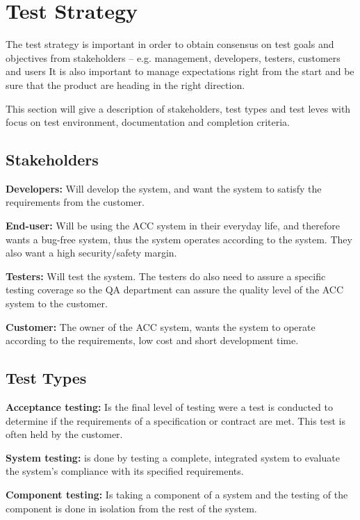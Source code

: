 \chapter{Test Strategy}
	
	The test strategy is important in order to obtain consensus on test goals and objectives 
	from stakeholders – e.g. management, developers, testers, customers and users
	It is also important to manage expectations right from the start and be sure that the product
	are heading in the right direction.

	This section will give a description of stakeholders, test types and test leves with focus on
	test environment, documentation and completion criteria. 
	


\clearpage
	\section{Stakeholders}

		{\bf Developers:} Will develop the system, and want the system to satisfy 
		the requirements from the customer. 

		{\bf End-user:} Will be using the ACC system in their everyday life, and therefore 
		wants a bug-free system, thus the system operates according to the system. 
		They also want a high security/safety margin.

		{\bf Testers:} Will test the system. The testers do also need to assure a 
		specific testing coverage so the QA department can assure the quality level 
		of the ACC system to the customer. 

		{\bf Customer:} The owner of the ACC system, wants the system to operate 
		according to the requirements, low cost and short development time.


	\section{Test Types}

		{\bf Acceptance testing:} Is the final level of testing were a test is conducted to determine 
		if the requirements of a specification or contract are met. This test is often held by the customer. 

		{\bf System testing:} is done by testing a complete, integrated system to evaluate the system's
		compliance with its specified requirements.
		
		{\bf Component testing:} Is taking a component of a system and the testing of the component 
		is done in isolation from the rest of the system.
		
